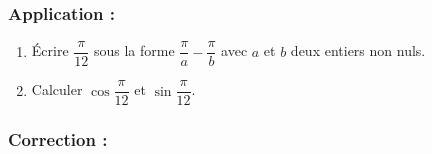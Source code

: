 \documentclass[12pt,a4paper]{article}
\begin{document}
\subsubsection*{\textcolor{myblue}{Application :}}

\begin{enumerate}
    \item Écrire $\dfrac{\pi}{12}$ sous la forme $\dfrac{\pi}{a} - \dfrac{\pi}{b}$ avec $a$ et $b$ deux entiers non nuls.
    \item Calculer $\cos \dfrac{\pi}{12}$ et $\sin \dfrac{\pi}{12}$.
\end{enumerate}

\vspace{0.5cm}

\subsubsection*{\textcolor{myblue}{Correction :}}
\end{document}
